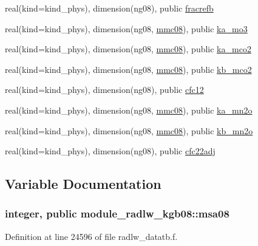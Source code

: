 \begin{DoxyCompactItemize}
real(kind=kind\+\_\+phys), dimension(ng08), public \hyperlink{group__module__radlw__main_ga0ae7e4c01034a2b95c03b041537b962e}{fracrefb}
\item 
real(kind=kind\+\_\+phys), dimension(ng08, \hyperlink{group__module__radlw__main_ga9e3bfc1880221c18fa07817eb62bcc47}{mmc08}), public \hyperlink{group__module__radlw__main_ga7dec65e880c278f44419c1ae01490eae}{ka\+\_\+mo3}
\item 
real(kind=kind\+\_\+phys), dimension(ng08, \hyperlink{group__module__radlw__main_ga9e3bfc1880221c18fa07817eb62bcc47}{mmc08}), public \hyperlink{group__module__radlw__main_ga0fcd13503b3253ec6aab0aa52056f634}{ka\+\_\+mco2}
\item 
real(kind=kind\+\_\+phys), dimension(ng08, \hyperlink{group__module__radlw__main_ga9e3bfc1880221c18fa07817eb62bcc47}{mmc08}), public \hyperlink{group__module__radlw__main_ga9a85770aee1b88b9323d9466c1772ec4}{kb\+\_\+mco2}
\item 
real(kind=kind\+\_\+phys), dimension(ng08), public \hyperlink{group__module__radlw__main_ga010239f14788bc1ed9953133e30a62fd}{cfc12}
\item 
real(kind=kind\+\_\+phys), dimension(ng08, \hyperlink{group__module__radlw__main_ga9e3bfc1880221c18fa07817eb62bcc47}{mmc08}), public \hyperlink{group__module__radlw__main_ga61949dc331e9a58d4f2a31b625481795}{ka\+\_\+mn2o}
\item 
real(kind=kind\+\_\+phys), dimension(ng08, \hyperlink{group__module__radlw__main_ga9e3bfc1880221c18fa07817eb62bcc47}{mmc08}), public \hyperlink{group__module__radlw__main_ga9a8e2f789421acc307e37b03478efb4b}{kb\+\_\+mn2o}
\item 
real(kind=kind\+\_\+phys), dimension(ng08), public \hyperlink{group__module__radlw__main_ga38a3ce7d8f3db6b732511cf78ef735db}{cfc22adj}
\end{DoxyCompactItemize}


\subsection{Variable Documentation}
\subsubsection[{\texorpdfstring{msa08}{msa08}}]{\setlength{\rightskip}{0pt plus 5cm}integer, public module\+\_\+radlw\+\_\+kgb08\+::msa08}\hypertarget{namespacemodule__radlw__kgb08_a74e4bd8f4b00d0ff6bae1a39d9bddd3b}{}\label{namespacemodule__radlw__kgb08_a74e4bd8f4b00d0ff6bae1a39d9bddd3b}


Definition at line 24596 of file radlw\+\_\+datatb.\+f.

